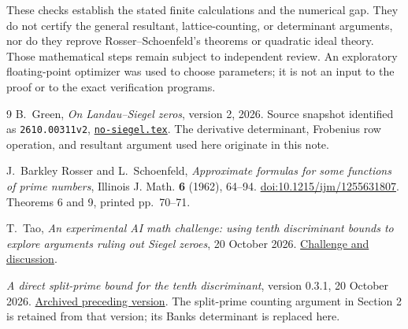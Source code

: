 \documentclass[11pt]{article}
\begin{document}
These checks establish the stated finite calculations and the numerical
gap. They do not certify the general resultant, lattice-counting, or
determinant arguments, nor do they reprove Rosser--Schoenfeld's
theorems or quadratic ideal theory. Those mathematical steps remain
subject to independent review. An exploratory floating-point optimizer
was used to choose parameters; it is not an input to the proof or to
the exact verification programs.

\begin{thebibliography}{9}
B.~Green, \emph{On Landau--Siegel zeros}, version 2, 2026.
Source snapshot identified as \texttt{2610.00311v2},
\href{https://hexagonmath.org/api/v1/works/2610.00311v2/source?path=no-siegel.tex}
{\texttt{no-siegel.tex}}.
The derivative determinant, Frobenius row operation, and resultant
argument used here originate in this note.

J.~Barkley Rosser and L.~Schoenfeld,
\emph{Approximate formulas for some functions of prime numbers},
Illinois J. Math. \textbf{6} (1962), 64--94.
\href{https://doi.org/10.1215/ijm/1255631807}{doi:10.1215/ijm/1255631807}.
Theorems 6 and 9, printed pp.~70--71.

T.~Tao, \emph{An experimental AI math challenge: using tenth
discriminant bounds to explore arguments ruling out Siegel zeroes},
20 October 2026.
\href{https://terrytao.wordpress.com/2026/10/20/an-experimental-ai-math-challenge-using-tenth-discriminant-bounds-to-explore-arguments-ruling-out-siegel-zeroes/}
{Challenge and discussion}.

\emph{A direct split-prime bound for the tenth discriminant},
version 0.3.1, 20 October 2026.
\href{https://github.com/twinheterodox/tenth-discriminant/releases/tag/v0.3.1}
{Archived preceding version}.
The split-prime counting argument in Section 2 is retained from that
version; its Banks determinant is replaced here.
\end{thebibliography}
\end{document}

